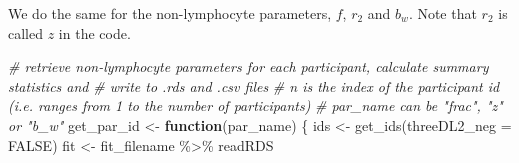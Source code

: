 \documentclass[
]{article}
\newenvironment{Shaded}{\begin{snugshade}}{\end{snugshade}}
\newcommand{\AttributeTok}[1]{\textcolor[rgb]{0.77,0.63,0.00}{#1}}
\newcommand{\CommentTok}[1]{\textcolor[rgb]{0.56,0.35,0.01}{\textit{#1}}}
\newcommand{\ConstantTok}[1]{\textcolor[rgb]{0.00,0.00,0.00}{#1}}
\newcommand{\ControlFlowTok}[1]{\textcolor[rgb]{0.13,0.29,0.53}{\textbf{#1}}}
\newcommand{\FunctionTok}[1]{\textcolor[rgb]{0.00,0.00,0.00}{#1}}
\newcommand{\NormalTok}[1]{#1}
\newcommand{\OtherTok}[1]{\textcolor[rgb]{0.56,0.35,0.01}{#1}}
\newcommand{\SpecialCharTok}[1]{\textcolor[rgb]{0.00,0.00,0.00}{#1}}
\begin{document}
We do the same for the non-lymphocyte parameters, \(f\), \(r_2\) and
\(b_w\). Note that \(r_2\) is called \(z\) in the code.

\begin{Shaded}
\begin{Highlighting}[]
\CommentTok{\# retrieve non{-}lymphocyte parameters for each participant, calculate summary statistics and}
\CommentTok{\# write to .rds and .csv files}
\CommentTok{\# n is the index of the participant id (i.e. ranges from 1 to the number of participants)}
\CommentTok{\# par\_name can be "frac", "z" or "b\_w"}
\NormalTok{get\_par\_id }\OtherTok{\textless{}{-}} \ControlFlowTok{function}\NormalTok{(par\_name) \{}
\NormalTok{  ids }\OtherTok{\textless{}{-}} \FunctionTok{get\_ids}\NormalTok{(}\AttributeTok{threeDL2\_neg =} \ConstantTok{FALSE}\NormalTok{)}
\NormalTok{  fit }\OtherTok{\textless{}{-}}\NormalTok{ fit\_filename }\SpecialCharTok{\%\textgreater{}\%}\NormalTok{ readRDS}
  

\end{Highlighting}
\end{Shaded}
\end{document}
